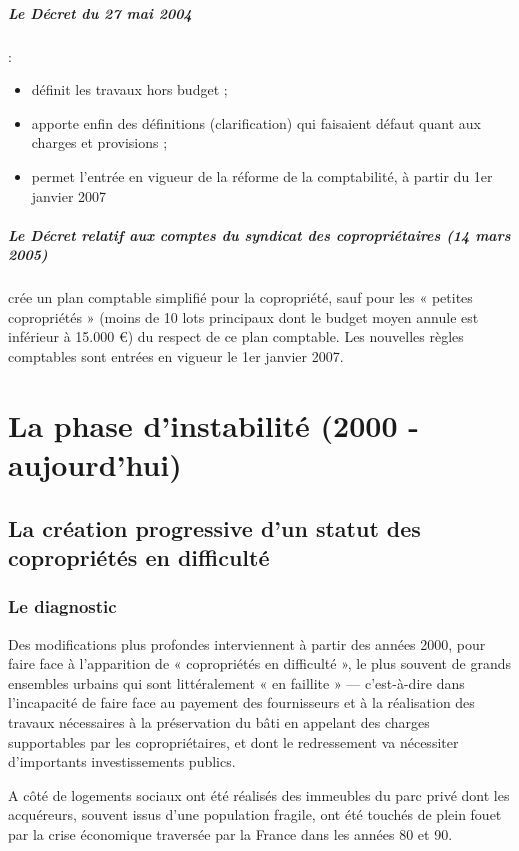 				\subparagraph{Le Décret du 27 mai 2004} :
				\begin{itemize}
					\item  définit les travaux hors budget ;
					
					\item  apporte enfin des définitions (clarification) qui faisaient défaut quant aux charges et provisions ;
					
					\item  permet l’entrée en vigueur de la réforme de la comptabilité, à partir du 1er janvier 2007
				\end{itemize}
				
				\subparagraph{Le Décret relatif aux comptes du syndicat des copropriétaires (14 mars 2005)} crée un plan comptable simplifié pour la copropriété, sauf pour les « petites copropriétés » (moins de 10 lots principaux dont le budget moyen annule est inférieur à 15.000 \euro) du respect de ce plan comptable. Les nouvelles règles comptables sont entrées en vigueur le 1er janvier 2007.
	
	\section{La phase d’instabilité (2000 - aujourd'hui)}
	
		\subsection{La création progressive d’un statut des copropriétés en difficulté}
		
			\subsubsection{Le diagnostic}
			
				Des modifications plus profondes interviennent à partir des années 2000, pour faire face à l’apparition de « copropriétés en difficulté », le plus souvent de grands ensembles urbains qui sont littéralement « en faillite » --- c’est-à-dire dans l’incapacité de faire face au payement des fournisseurs et à la réalisation des travaux nécessaires à la préservation du bâti en appelant des charges supportables par les copropriétaires, et dont le redressement va nécessiter d’importants investissements publics.
				
				A côté de logements sociaux ont été réalisés des immeubles du parc privé dont les acquéreurs, souvent issus d’une population fragile, ont été touchés de plein fouet par la crise économique traversée par la France dans les années 80 et 90.
				
